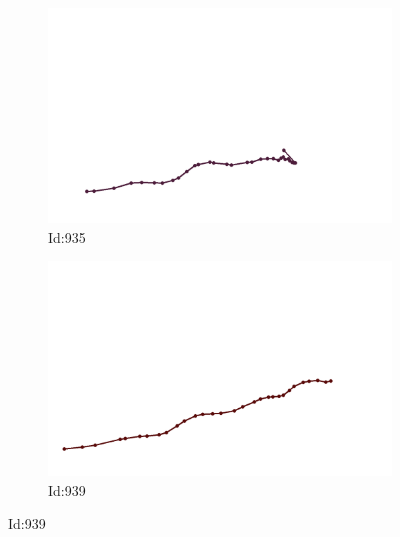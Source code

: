 \documentclass[12pt,twoside]{report}
\begin{document}
\begin{figure}
\centering
\begin{subfigure}[b]{0.20\textwidth}
\centering
\includegraphics[width=\textwidth]{../../trajectories/935.png}
\caption{Id:935}
\end{subfigure}
\begin{subfigure}[b]{0.20\textwidth}
\centering
\includegraphics[width=\textwidth]{../../trajectories/939.png}
\caption{Id:939}
\end{subfigure}
\end{figure}
\end{document}
